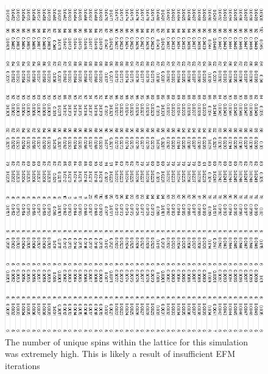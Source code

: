 \documentclass{article}
\begin{document}
\begin{figure}[ht]
\centering
\includegraphics[keepaspectratio,scale=0.75]{111_2000/005to000RSpinChart.png}
\caption{The number of unique spins within the lattice for this simulation was extremely high. This is likely 
a result of insufficient EFM iterations}
\end{figure}
\clearpage
\end{document}
